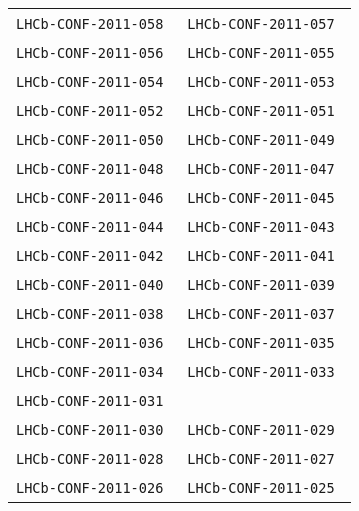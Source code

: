 \begin{center}
\begin{longtable}{ll}
\texttt{LHCb-CONF-2011-058}~\cite{LHCb-CONF-2011-058} & 
\texttt{LHCb-CONF-2011-057}~\cite{LHCb-CONF-2011-057} \\
\texttt{LHCb-CONF-2011-056}~\cite{LHCb-CONF-2011-056} & 
\texttt{LHCb-CONF-2011-055}~\cite{LHCb-CONF-2011-055} \\ 
\texttt{LHCb-CONF-2011-054}~\cite{LHCb-CONF-2011-054} &
\texttt{LHCb-CONF-2011-053}~\cite{LHCb-CONF-2011-053} \\ 
\texttt{LHCb-CONF-2011-052}~\cite{LHCb-CONF-2011-052} &
\texttt{LHCb-CONF-2011-051}~\cite{LHCb-CONF-2011-051} \\ 
\texttt{LHCb-CONF-2011-050}~\cite{LHCb-CONF-2011-050} &
\texttt{LHCb-CONF-2011-049}~\cite{LHCb-CONF-2011-049} \\
\texttt{LHCb-CONF-2011-048}~\cite{LHCb-CONF-2011-048} & 
\texttt{LHCb-CONF-2011-047}~\cite{LHCb-CONF-2011-047} \\
\texttt{LHCb-CONF-2011-046}~\cite{LHCb-CONF-2011-046} & 
\texttt{LHCb-CONF-2011-045}~\cite{LHCb-CONF-2011-045} \\ 
\texttt{LHCb-CONF-2011-044}~\cite{LHCb-CONF-2011-044} &
\texttt{LHCb-CONF-2011-043}~\cite{LHCb-CONF-2011-043} \\ 
\texttt{LHCb-CONF-2011-042}~\cite{LHCb-CONF-2011-042} &
\texttt{LHCb-CONF-2011-041}~\cite{LHCb-CONF-2011-041} \\ 
\texttt{LHCb-CONF-2011-040}~\cite{LHCb-CONF-2011-040} &
\texttt{LHCb-CONF-2011-039}~\cite{LHCb-CONF-2011-039} \\
\texttt{LHCb-CONF-2011-038}~\cite{LHCb-CONF-2011-038} &
\texttt{LHCb-CONF-2011-037}~\cite{LHCb-CONF-2011-037} \\
\texttt{LHCb-CONF-2011-036}~\cite{LHCb-CONF-2011-036} &
\texttt{LHCb-CONF-2011-035}~\cite{LHCb-CONF-2011-035} \\
\texttt{LHCb-CONF-2011-034}~\cite{LHCb-CONF-2011-034} &
\texttt{LHCb-CONF-2011-033}~\cite{LHCb-CONF-2011-033} \\
\texttt{LHCb-CONF-2011-031}~\cite{LHCb-CONF-2011-031} \\
\texttt{LHCb-CONF-2011-030}~\cite{LHCb-CONF-2011-030} &
\texttt{LHCb-CONF-2011-029}~\cite{LHCb-CONF-2011-029} \\
\texttt{LHCb-CONF-2011-028}~\cite{LHCb-CONF-2011-028} &
\texttt{LHCb-CONF-2011-027}~\cite{LHCb-CONF-2011-027} \\
\texttt{LHCb-CONF-2011-026}~\cite{LHCb-CONF-2011-026} &
\texttt{LHCb-CONF-2011-025}~\cite{LHCb-CONF-2011-025} \\

\end{longtable}
\end{center}
